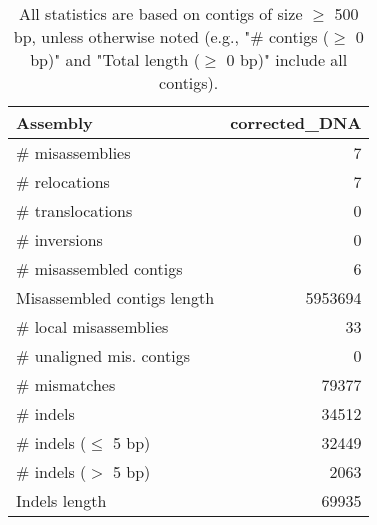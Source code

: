\documentclass[12pt,a4paper]{article}
\begin{document}
\begin{table}[ht]
\begin{center}
\caption{All statistics are based on contigs of size $\geq$ 500 bp, unless otherwise noted (e.g., "\# contigs ($\geq$ 0 bp)" and "Total length ($\geq$ 0 bp)" include all contigs).}
\begin{tabular}{|l*{1}{|r}|}
\hline
Assembly & corrected\_DNA \\ \hline
\# misassemblies & 7 \\ \hline
\hspace{5mm}\# relocations & 7 \\ \hline
\hspace{5mm}\# translocations & 0 \\ \hline
\hspace{5mm}\# inversions & 0 \\ \hline
\# misassembled contigs & 6 \\ \hline
Misassembled contigs length & 5953694 \\ \hline
\# local misassemblies & 33 \\ \hline
\# unaligned mis. contigs & 0 \\ \hline
\# mismatches & 79377 \\ \hline
\# indels & 34512 \\ \hline
\hspace{5mm}\# indels ($\leq$ 5 bp) & 32449 \\ \hline
\hspace{5mm}\# indels ($>$ 5 bp) & 2063 \\ \hline
Indels length & 69935 \\ \hline
\end{tabular}
\end{center}
\end{table}
\end{document}
